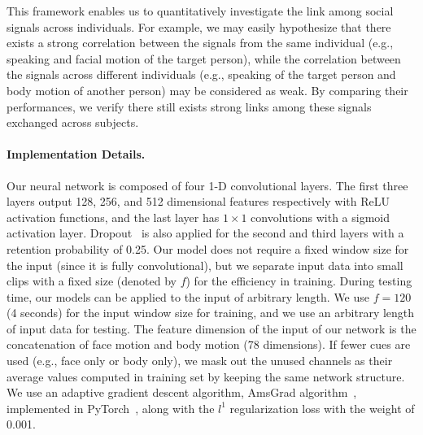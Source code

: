 This framework enables us to quantitatively investigate the link among social signals across individuals. For example, we may easily hypothesize that there exists a strong correlation between the signals from the same individual (e.g., speaking and facial motion of the target person), while the correlation between the signals across different individuals (e.g., speaking of the target person and body motion of another person) may be considered as weak. By comparing their performances, we verify there still exists strong links among these signals exchanged across subjects. 


\paragraph{Implementation Details.}
Our neural network is composed of four 1-D convolutional layers. The first three layers output 128, 256, and 512 dimensional features respectively with ReLU activation functions, and the last layer has $1\times1$ convolutions with a sigmoid activation layer. Dropout~\cite{srivastava2014dropout} is also applied for the second and third layers with a retention probability of 0.25. Our model does not require a fixed window size for the input (since it is fully convolutional), but we separate input data into small clips with a fixed size (denoted by $f$) for the efficiency in training. During testing time, our models can be applied to the input of arbitrary length. We use $f=120$ (4 seconds) for the input window size for training, and we use an arbitrary length of input data for testing. The feature dimension of the input of our network is the concatenation of face motion and body motion (78 dimensions). If fewer cues are used (e.g., face only or body only), we mask out the unused channels as their average values computed in training set by keeping the same network structure. We use an adaptive gradient descent algorithm, AmsGrad algorithm~\cite{reddi2018convergence}, implemented in PyTorch~\cite{paszke2017automatic}, along with the $l^1$ regularization loss with the weight of 0.001. 

